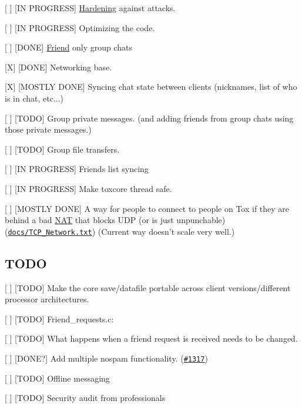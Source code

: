 \begin{DoxyItemize}
\begin{DoxyItemize}
\item \mbox{[} \mbox{]} \mbox{[}I\+N P\+R\+O\+G\+R\+E\+S\+S\mbox{]} \hyperlink{struct_hardening}{Hardening} against attacks.
\item \mbox{[} \mbox{]} \mbox{[}I\+N P\+R\+O\+G\+R\+E\+S\+S\mbox{]} Optimizing the code.
\end{DoxyItemize}
\item \mbox{[} \mbox{]} \mbox{[}D\+O\+N\+E\mbox{]} \hyperlink{struct_friend}{Friend} only group chats
\begin{DoxyItemize}
\item \mbox{[}X\mbox{]} \mbox{[}D\+O\+N\+E\mbox{]} Networking base.
\item \mbox{[}X\mbox{]} \mbox{[}M\+O\+S\+T\+L\+Y D\+O\+N\+E\mbox{]} Syncing chat state between clients (nicknames, list of who is in chat, etc...)
\item \mbox{[} \mbox{]} \mbox{[}T\+O\+D\+O\mbox{]} Group private messages. (and adding friends from group chats using those private messages.)
\item \mbox{[} \mbox{]} \mbox{[}T\+O\+D\+O\mbox{]} Group file transfers.
\end{DoxyItemize}
\item \mbox{[} \mbox{]} \mbox{[}I\+N P\+R\+O\+G\+R\+E\+S\+S\mbox{]} Friends list syncing
\item \mbox{[} \mbox{]} \mbox{[}I\+N P\+R\+O\+G\+R\+E\+S\+S\mbox{]} Make toxcore thread safe.
\item \mbox{[} \mbox{]} \mbox{[}M\+O\+S\+T\+L\+Y D\+O\+N\+E\mbox{]} A way for people to connect to people on Tox if they are behind a bad \hyperlink{struct_n_a_t}{N\+A\+T} that blocks U\+D\+P (or is just unpunchable) (\href{TCP_Network.txt}{\tt docs/\+T\+C\+P\+\_\+\+Network.\+txt}) (Current way doesn't scale very well.)
\end{DoxyItemize}

\subsection*{T\+O\+D\+O}


\begin{DoxyItemize}
\item \mbox{[} \mbox{]} \mbox{[}T\+O\+D\+O\mbox{]} Make the core save/datafile portable across client versions/different processor architectures.
\item \mbox{[} \mbox{]} \mbox{[}T\+O\+D\+O\mbox{]} Friend\+\_\+requests.\+c\+:
\begin{DoxyItemize}
\item \mbox{[} \mbox{]} \mbox{[}T\+O\+D\+O\mbox{]} What happens when a friend request is received needs to be changed.
\item \mbox{[} \mbox{]} \mbox{[}D\+O\+N\+E?\mbox{]} Add multiple nospam functionality. (\href{https://github.com/irungentoo/toxcore/pull/1317}{\tt \#1317})
\end{DoxyItemize}
\item \mbox{[} \mbox{]} \mbox{[}T\+O\+D\+O\mbox{]} Offline messaging
\item \mbox{[} \mbox{]} \mbox{[}T\+O\+D\+O\mbox{]} Security audit from professionals
\end{DoxyItemize}

